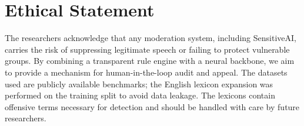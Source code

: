 \section{Ethical Statement}
\label{sec:ethics}

The researchers acknowledge that any moderation system, including SensitiveAI,
carries the risk of suppressing legitimate speech or failing to protect
vulnerable groups.  By combining a transparent rule engine with a neural
backbone, we aim to provide a mechanism for human-in-the-loop audit and appeal.
The datasets used are publicly available benchmarks; the English lexicon
expansion was performed on the training split to avoid data leakage.  The
lexicons contain offensive terms necessary for detection and should be handled
with care by future researchers.
